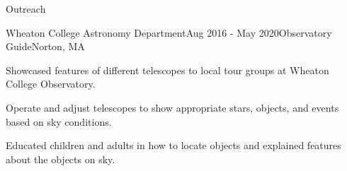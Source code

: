 \documentclass{resume} %
\begin{document}
\begin{rSection}{Outreach}

\begin{rSubsection}{Wheaton College Astronomy Department}{Aug 2016 - May 2020}{Observatory Guide}{Norton, MA}
\item Showcased features of different telescopes to local tour groups at Wheaton College Observatory.
\item Operate and adjust telescopes to show appropriate stars, objects, and events based on sky conditions.
\item Educated children and adults in how to locate objects and explained features about the objects on sky.

\end{rSubsection}

\end{rSection}

\end{document}
